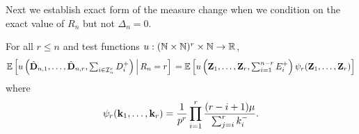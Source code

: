 Next we establish exact form of the measure change when we condition on the exact value of $R_n$ but not $\Delta_n = 0$.

\begin{lemma}
    \label{lem:exact-measure-change-no-conditioning}
    For all $r \leq n$ and test functions $u: ({\mathbb N} \times {\mathbb N})^r \times {\mathbb N} \to {\mathbb R}$,
    \begin{equation*}
        {\mathbb E} \left[ u\left( 
            \hat{{\mathbf D}}_{n, 1}, \ldots, \hat{{\mathbf D}}_{n, r}, \textstyle \sum_{i \in {\mathcal I}_n^c} D_i^+
        \right) \,\middle\vert\, R_n = r \right] \\
        =
        {\mathbb E} \left[
            u\left( {\mathbf Z}_1, \ldots, {\mathbf Z}_r, \textstyle \sum_{i = 1}^{n-r} E_i^+ \right)
            \psi_r({\mathbf Z}_1, \ldots, {\mathbf Z}_r)
        \right]
    \end{equation*}
    where
    \begin{equation*}
        \psi_r({\mathbf k}_1, \ldots, {\mathbf k}_r) =
        \frac{1}{p^r} \prod_{i=1}^r \frac{(r - i + 1)\mu}{\sum_{j=i}^r k_i^-}.
    \end{equation*}
\end{lemma}

